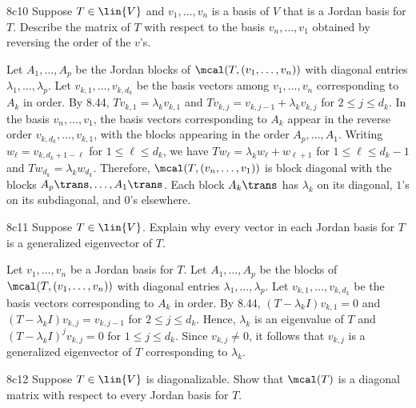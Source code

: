 \begin{exercise}{8c10}
    Suppose $T \in \lin{V}$ and $v_1, \ldots, v_n$ is a basis of $V$ that is a Jordan basis for $T$.
    Describe the matrix of $T$ with respect to the basis $v_n, \ldots, v_1$ obtained by reversing the order of the $v$'s.
\end{exercise}

\begin{sol}
    Let $A_1, \ldots, A_p$ be the Jordan blocks of $\mcal(T, (v_1, \ldots, v_n))$ with diagonal entries $\lambda_1, \ldots, \lambda_p$.
    Let $v_{k, 1}, \ldots, v_{k, d_k}$ be the basis vectors among $v_1, \ldots, v_n$ corresponding to $A_k$ in order.
    By 8.44, $T v_{k, 1} = \lambda_k v_{k, 1}$ and $T v_{k, j} = v_{k, j-1} + \lambda_k v_{k, j}$ for $2 \leq j \leq d_k$.
    In the basis $v_n, \ldots, v_1$, the basis vectors corresponding to $A_k$ appear in the reverse order $v_{k, d_k}, \ldots, v_{k, 1}$, with the blocks appearing in the order $A_p, \ldots, A_1$.
    Writing $w_\ell = v_{k, d_k+1-\ell}$ for $1 \leq \ell \leq d_k$, we have $T w_\ell = \lambda_k w_\ell + w_{\ell+1}$ for $1 \leq \ell \leq d_k - 1$ and $T w_{d_k} = \lambda_k w_{d_k}$.
    Therefore, $\mcal(T, (v_n, \ldots, v_1))$ is block diagonal with the blocks $A_p\trans, \ldots, A_1\trans$.
    Each block $A_k\trans$ has $\lambda_k$ on its diagonal, $1$'s on its subdiagonal, and $0$'s elsewhere.
\end{sol}

\begin{exercise}{8c11}
    Suppose $T \in \lin{V}$.
    Explain why every vector in each Jordan basis for $T$ is a generalized eigenvector of $T$.
\end{exercise}

\begin{sol}
    Let $v_1, \ldots, v_n$ be a Jordan basis for $T$.
    Let $A_1, \ldots, A_p$ be the blocks of $\mcal(T, (v_1, \ldots, v_n))$ with diagonal entries $\lambda_1, \ldots, \lambda_p$.
    Let $v_{k, 1}, \ldots, v_{k, d_k}$ be the basis vectors corresponding to $A_k$ in order.
    By 8.44, $(T - \lambda_k I) v_{k, 1} = 0$ and $(T - \lambda_k I) v_{k, j} = v_{k, j-1}$ for $2 \leq j \leq d_k$.
    Hence, $\lambda_k$ is an eigenvalue of $T$ and $(T - \lambda_k I)^j v_{k, j} = 0$ for $1 \leq j \leq d_k$.
    Since $v_{k, j} \neq 0$, it follows that $v_{k, j}$ is a generalized eigenvector of $T$ corresponding to $\lambda_k$.
\end{sol}

\begin{exercise}{8c12}
    Suppose $T \in \lin{V}$ is diagonalizable.
    Show that $\mcal(T)$ is a diagonal matrix with respect to every Jordan basis for $T$.
\end{exercise}

